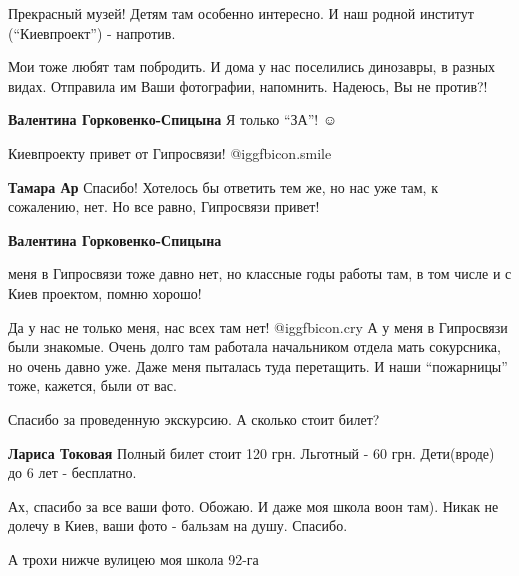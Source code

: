  
 
 
 
 

Прекрасный музей! Детям там особенно интересно. И наш родной институт
(\enquote{Киевпроект}) - напротив.


Мои тоже любят там побродить. И дома у нас поселились динозавры, в разных
видах. Отправила им Ваши фотографии, напомнить. Надеюсь, Вы не против?!


\textbf{Валентина Горковенко-Спицына} Я только \enquote{ЗА}! ☺ ️ 

Киевпроекту привет от Гипросвязи! @igg{fbicon.smile} 

\textbf{Тамара Ар} Спасибо! Хотелось бы ответить тем же, но нас уже там, к сожалению, нет. Но все равно, Гипросвязи привет!

\textbf{Валентина Горковенко-Спицына} 

меня в Гипросвязи тоже давно нет, но классные годы работы там, в том числе и с
Киев проектом, помню хорошо!


Да у нас не только меня, нас всех там нет!  @igg{fbicon.cry}  А у меня в Гипросвязи были
знакомые. Очень долго там работала начальником отдела мать сокурсника, но очень
давно уже. Даже меня пыталась туда перетащить. И наши \enquote{пожарницы} тоже,
кажется, были от вас.

Спасибо за проведенную экскурсию. А сколько стоит билет?

\textbf{Лариса Токовая} Полный билет стоит 120 грн.
Льготный - 60 грн.
Дети(вроде) до 6 лет - бесплатно.

Ах, спасибо за все ваши фото.
Обожаю.
И даже моя школа воон там).
Никак не долечу в Киев, ваши фото - бальзам на душу. Спасибо.

А трохи нижче вулицею моя школа 92-га
